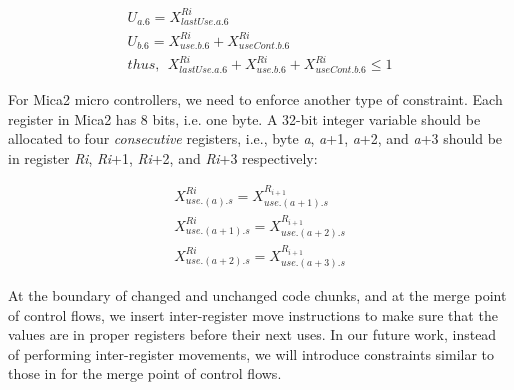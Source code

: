 \begin{small}
\begin{eqnarray}
U_{a.6} = X_{lastUse.a.6}^{Ri}\nonumber\\
U_{b.6} = X_{use.b.6}^{Ri} + X_{useCont.b.6}^{Ri} \nonumber\\
thus, ~~X_{lastUse.a.6}^{Ri} + X_{use.b.6}^{Ri} + X_{useCont.b.6}^{Ri} \leq 1
\end{eqnarray}
\end{small}

For Mica2 micro controllers, we need to enforce another type of
constraint. Each register in Mica2 has 8 bits, i.e. one byte. A
32-bit integer variable should be allocated to four {\em
consecutive} registers, i.e., byte {\it a}, {\it a}+1, {\it a}+2, and
{\it a}+3 should be in register {\it Ri}, {\it Ri}+1, {\it Ri}+2, and {\it
Ri}+3 respectively:

\begin{small}
\begin{eqnarray}
X_{use.(a).s}^{Ri} = X_{use.(a+1).s}^{R_{i+1}} \nonumber \\
X_{use.(a+1).s}^{Ri} = X_{use.(a+2).s}^{R_{i+1}} \nonumber \\
X_{use.(a+2).s}^{Ri} = X_{use.(a+3).s}^{R_{i+1}} 
\end{eqnarray} 
\end{small}

At the boundary of changed and unchanged code chunks, and at the merge
point of control flows, we insert inter-register move instructions to
make sure that the values are in proper registers before their next
uses. In our future work, instead of performing inter-register
movements, we will introduce constraints similar to those in
\cite{related:ilp} for the merge point of control flows.





